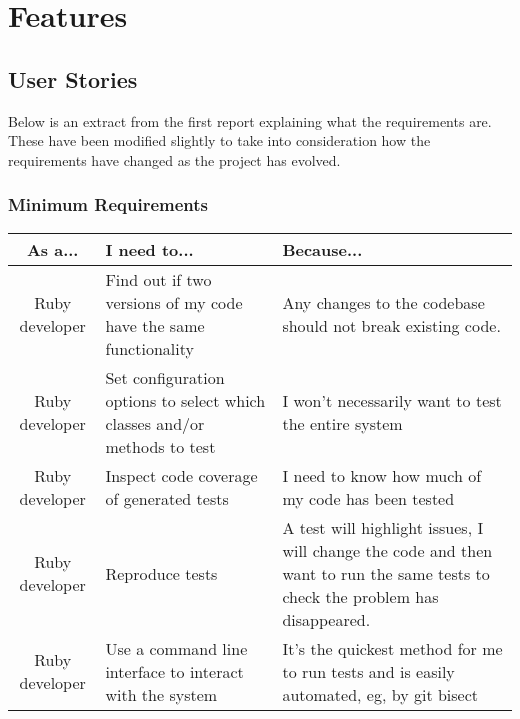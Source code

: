 \chapter{Features}

\def \colwidth {0.35\textwidth}
\section{User Stories}
  Below is an extract from the first report explaining what the requirements are.
  These have been modified slightly to take into consideration how the requirements have changed as the project has evolved.
  \subsection{Minimum Requirements}
    \begin{tabular}{| c | p{\colwidth} | p{\colwidth} |}
    \hline
    \textbf{As a...} & \textbf{I need to...} & \textbf{Because...} \\
    \hline
    Ruby developer &
    Find out if two versions of my code have the same functionality &
    Any changes to the codebase should not break existing code. \\
    \hline
    Ruby developer &
    Set configuration options to select which classes and/or methods to test &
    I won't necessarily want to test the entire system \\
    \hline
    Ruby developer &
    Inspect code coverage of generated tests &
    I need to know how much of my code has been tested \\
    \hline
    Ruby developer &
    Reproduce tests &
    A test will highlight issues, I will change the code and then want to run the same tests to check the problem has disappeared. \\
    \hline
    Ruby developer &
    Use a command line interface to interact with the system &
    It's the quickest method for me to run tests and is easily automated, eg, by git bisect \\
    \hline
    \end{tabular}

